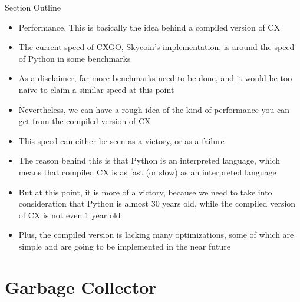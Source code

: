 \documentclass[11pt,fleqn,openany]{book} %
\begin{document}
\begin{remark}
Section Outline
    \begin{itemize}
    \item Performance. This is basically the idea behind a compiled version of CX
    \item The current speed of CXGO, Skycoin's implementation, is around the speed of Python in some benchmarks
    \item As a disclaimer, far more benchmarks need to be done, and it would be too naive to claim a similar speed at this point
    \item Nevertheless, we can have a rough idea of the kind of performance you can get from the compiled version of CX
    \item This speed can either be seen as a victory, or as a failure
    \item The reason behind this is that Python is an interpreted language, which means that compiled CX is as fast (or slow) as an interpreted language
    \item But at this point, it is more of a victory, because we need to take into consideration that Python is almost 30 years old, while the compiled version of CX is not even 1 year old
    \item Plus, the compiled version is lacking many optimizations, some of which are simple and are going to be implemented in the near future
    \end{itemize}
\end{remark}


\chapter{Garbage Collector}
\label{chapter:garbage-collector}
\end{document}
